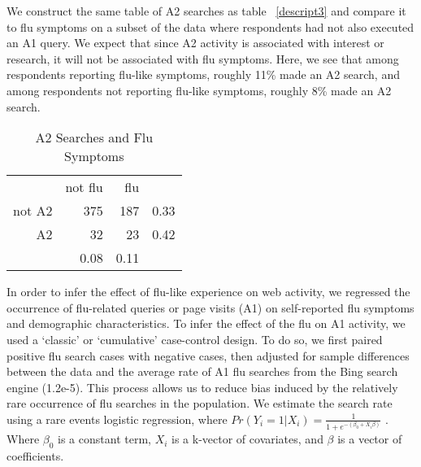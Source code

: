 \documentclass[12pt]{article}
\begin{document}
We construct the same table of A2 searches as table ~\ref{descript3} and compare it to flu symptoms on a subset of the data where respondents had not also executed an A1 query. We expect that since A2 activity is associated with interest or research, it will not be associated with flu symptoms. Here, we see that among respondents reporting flu-like symptoms, roughly 11\% made an A2 search, and among respondents not reporting flu-like symptoms, roughly 8\% made an A2 search. 

\begin{table}[!htbp]
\centering
  \caption{A2 Searches and Flu Symptoms} 
  \label{descript4} 
\begin{tabular}{rrrr}
  \hline
    & not flu &  flu & \\
not A2 & 375 & 187 & 0.33 \\
A2 & 32 & 23 & 0.42 \\
   \hline
   & 0.08 & 0.11 & \\
   \hline
\end{tabular}
\end{table}




In order to infer the effect of flu-like experience on web activity, we regressed the occurrence of flu-related queries or page visits (A1) on self-reported flu symptoms and demographic characteristics. To infer the effect of the flu on A1 activity, we used a `classic' or `cumulative' case-control design. To do so, we first paired positive flu search cases with negative cases, then adjusted for sample differences between the data and the average rate of A1 flu searches from the Bing search engine (1.2e-5). This process allows us to reduce bias induced by the relatively rare occurrence of flu searches in the population. We estimate the search rate using a rare events logistic regression, where $Pr(Y_i=1|X_i) = \frac{1}{1+e^{ - (\beta_0 + X_i \beta ) }}$ . Where $\beta_0$ is a constant term, $X_i$ is a k-vector of covariates, and $\beta$ is a vector of coefficients. 
\end{document}
